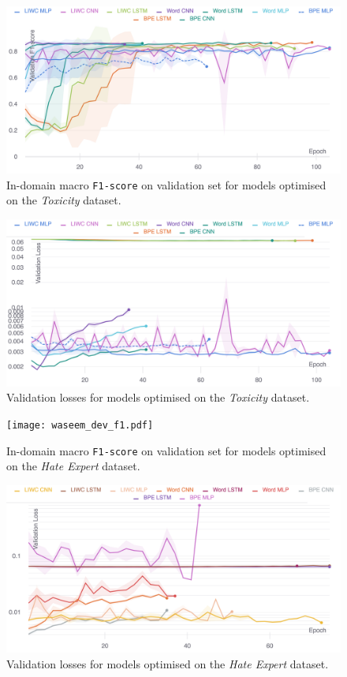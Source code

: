 \begin{figure}
    \centering
    \includegraphics[width=\textwidth]{wulczyn_dev_f1.pdf}
    \caption{In-domain macro \texttt{F1-score} on validation set for models optimised on the \textit{Toxicity} dataset.}
    \label{fig:wulczyn_dev_f1}
\end{figure}
\begin{figure}
    \centering
    \includegraphics[width=\textwidth]{wulczyn_dev_loss_stderr_logscale.pdf}
    \caption{Validation losses for models optimised on the \textit{Toxicity} dataset.}
    \label{fig:wulczyn_dev_loss}
\end{figure}

\begin{figure}
    \centering
    \texttt{[image: waseem\_dev\_f1.pdf]}
    \caption{In-domain macro \texttt{F1-score} on validation set for models optimised on the \textit{Hate Expert} dataset.}
    \label{fig:waseem_dev_f1}
\end{figure}
\begin{figure}
    \centering
    \includegraphics[width=\textwidth]{waseem_dev_loss_stderr_logscale.pdf}
    \caption{Validation losses for models optimised on the \textit{Hate Expert} dataset.}
    \label{fig:waseem_dev_loss}
\end{figure}

